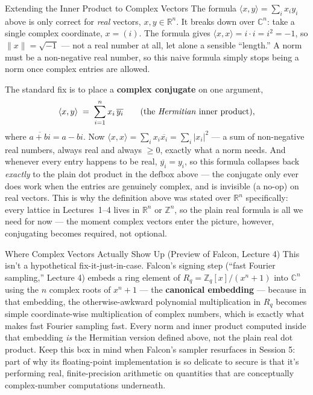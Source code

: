 \begin{rmkbox}{Extending the Inner Product to Complex Vectors}
The formula $\langle x,y\rangle=\sum_i x_iy_i$ above is only correct for \emph{real} vectors, $x,y\in\mathbb{R}^n$. It breaks down over $\mathbb{C}^n$: take a single complex coordinate, $x=(i)$. The formula gives $\langle x,x\rangle = i\cdot i = i^2 = -1$, so $\|x\| = \sqrt{-1}$ --- not a real number at all, let alone a sensible ``length.'' A norm must be a non-negative real number, so this naive formula simply stops being a norm once complex entries are allowed.

The standard fix is to place a \textbf{complex conjugate} on one argument,
$$
\langle x,y\rangle \;=\; \sum_{i=1}^n x_i\,\overline{y_i} \qquad \text{(the \emph{Hermitian} inner product)},
$$
where $\overline{a+bi} = a-bi$. Now $\langle x,x\rangle = \sum_i x_i\overline{x_i} = \sum_i |x_i|^2$ --- a sum of non-negative real numbers, always real and always $\ge 0$, exactly what a norm needs. And whenever every entry happens to be real, $\overline{y_i}=y_i$, so this formula collapses back \emph{exactly} to the plain dot product in the defbox above --- the conjugate only ever does work when the entries are genuinely complex, and is invisible (a no-op) on real vectors. This is why the definition above was stated over $\mathbb{R}^n$ specifically: every lattice in Lectures~1--4 lives in $\mathbb{R}^n$ or $\mathbb{Z}^n$, so the plain real formula is all we need for now --- the moment complex vectors enter the picture, however, conjugating becomes required, not optional.
\end{rmkbox}

\begin{previewbox}{Where Complex Vectors Actually Show Up (Preview of Falcon, Lecture 4)}
This isn't a hypothetical fix-it-just-in-case. Falcon's signing step (``fast Fourier sampling,'' Lecture 4) embeds a ring element of $R_q = \mathbb{Z}_q[x]/(x^n+1)$ into $\mathbb{C}^n$ using the $n$ complex roots of $x^n+1$ --- the \textbf{canonical embedding} --- because in that embedding, the otherwise-awkward polynomial multiplication in $R_q$ becomes simple coordinate-wise multiplication of complex numbers, which is exactly what makes fast Fourier sampling fast. Every norm and inner product computed inside that embedding \emph{is} the Hermitian version defined above, not the plain real dot product. Keep this box in mind when Falcon's sampler resurfaces in Session 5: part of why its floating-point implementation is so delicate to secure is that it's performing real, finite-precision arithmetic on quantities that are conceptually complex-number computations underneath.
\end{previewbox}

